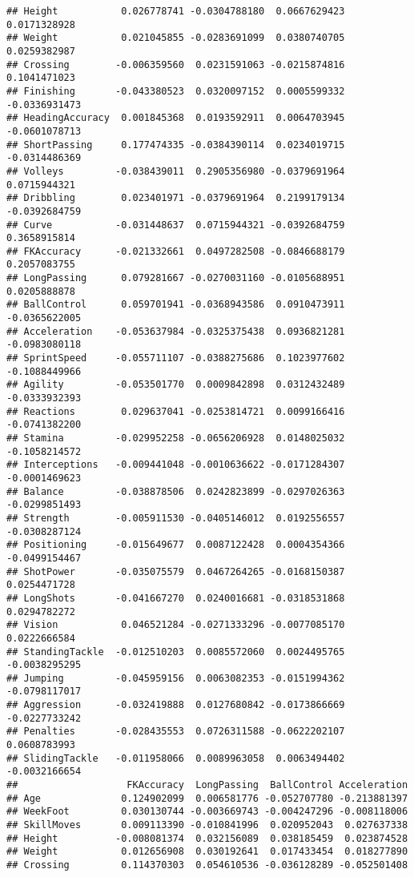 \documentclass[
]{article}
\begin{document}
\begin{verbatim}
## Height           0.026778741 -0.0304788180  0.0667629423  0.0171328928
## Weight           0.021045855 -0.0283691099  0.0380740705  0.0259382987
## Crossing        -0.006359560  0.0231591063 -0.0215874816  0.1041471023
## Finishing       -0.043380523  0.0320097152  0.0005599332 -0.0336931473
## HeadingAccuracy  0.001845368  0.0193592911  0.0064703945 -0.0601078713
## ShortPassing     0.177474335 -0.0384390114  0.0234019715 -0.0314486369
## Volleys         -0.038439011  0.2905356980 -0.0379691964  0.0715944321
## Dribbling        0.023401971 -0.0379691964  0.2199179134 -0.0392684759
## Curve           -0.031448637  0.0715944321 -0.0392684759  0.3658915814
## FKAccuracy      -0.021332661  0.0497282508 -0.0846688179  0.2057083755
## LongPassing      0.079281667 -0.0270031160 -0.0105688951  0.0205888878
## BallControl      0.059701941 -0.0368943586  0.0910473911 -0.0365622005
## Acceleration    -0.053637984 -0.0325375438  0.0936821281 -0.0983080118
## SprintSpeed     -0.055711107 -0.0388275686  0.1023977602 -0.1088449966
## Agility         -0.053501770  0.0009842898  0.0312432489 -0.0333932393
## Reactions        0.029637041 -0.0253814721  0.0099166416 -0.0741382200
## Stamina         -0.029952258 -0.0656206928  0.0148025032 -0.1058214572
## Interceptions   -0.009441048 -0.0010636622 -0.0171284307 -0.0001469623
## Balance         -0.038878506  0.0242823899 -0.0297026363 -0.0299851493
## Strength        -0.005911530 -0.0405146012  0.0192556557 -0.0308287124
## Positioning     -0.015649677  0.0087122428  0.0004354366 -0.0499154467
## ShotPower       -0.035075579  0.0467264265 -0.0168150387  0.0254471728
## LongShots       -0.041667270  0.0240016681 -0.0318531868  0.0294782272
## Vision           0.046521284 -0.0271333296 -0.0077085170  0.0222666584
## StandingTackle  -0.012510203  0.0085572060  0.0024495765 -0.0038295295
## Jumping         -0.045959156  0.0063082353 -0.0151994362 -0.0798117017
## Aggression      -0.032419888  0.0127680842 -0.0173866669 -0.0227733242
## Penalties       -0.028435553  0.0726311588 -0.0622202107  0.0608783993
## SlidingTackle   -0.011958066  0.0089963058  0.0063494402 -0.0032166654
##                   FKAccuracy  LongPassing  BallControl Acceleration
## Age              0.124902099  0.006581776 -0.052707780 -0.213881397
## WeekFoot         0.030130744 -0.003669743 -0.004247296 -0.008118006
## SkillMoves       0.009113390 -0.010841996  0.020952043  0.027637338
## Height          -0.008081374  0.032156089  0.038185459  0.023874528
## Weight           0.012656908  0.030192641  0.017433454  0.018277890
## Crossing         0.114370303  0.054610536 -0.036128289 -0.052501408

\end{verbatim}
\end{document}
